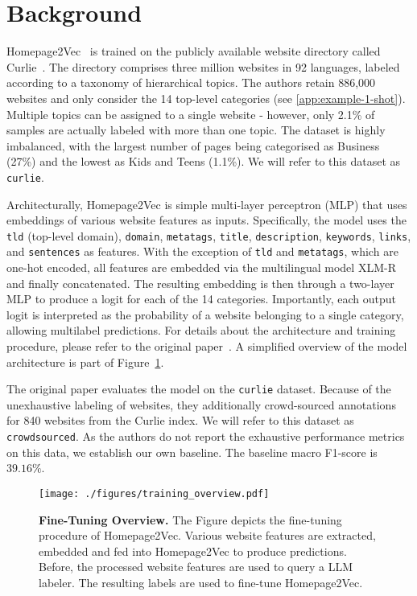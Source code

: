 \section{Background}\label{sec:background}

Homepage2Vec~\cite{homepage2vec} is trained on the publicly available website directory called Curlie~\cite{curlie}. The directory comprises three million websites in 92 languages, labeled according to a taxonomy of hierarchical topics. The authors retain 886,000 websites and only consider the 14 top-level categories (see \ref{app:example-1-shot}). Multiple topics can be assigned to a single website - however, only 2.1\% of samples are actually labeled with more than one topic. The dataset is highly imbalanced, with the largest number of pages being categorised as Business (27\%) and the lowest as Kids and Teens (1.1\%). We will refer to this dataset as \texttt{curlie}.


Architecturally, Homepage2Vec is simple multi-layer perceptron (MLP) that uses embeddings of various website features as inputs.
Specifically, the model uses the \texttt{tld} (top-level domain), \texttt{domain}, \texttt{metatags}, \texttt{title}, \texttt{description}, \texttt{keywords}, \texttt{links}, and \texttt{sentences} as features. With the exception of \texttt{tld} and \texttt{metatags}, which are one-hot encoded, all features are embedded via the multilingual model XLM-R~\cite{xmlr} and finally concatenated. The resulting embedding is then through a two-layer MLP to produce a logit for each of the 14 categories. Importantly, each output logit is interpreted as the probability of a website belonging to a single category, allowing multilabel predictions. For details about the architecture and training procedure, please refer to the original paper~\cite{homepage2vec}. A simplified overview of the model architecture is part of Figure~\ref{fig:train-overview}.

The original paper evaluates the model on the \texttt{curlie} dataset. Because of the unexhaustive labeling of websites, they additionally crowd-sourced annotations for 840 websites from the Curlie index. We will refer to this dataset as \texttt{crowdsourced}. As the authors do not report the exhaustive performance metrics on this data, we establish our own baseline. The baseline macro F1-score is $39.16\%$. 

\begin{figure}[!ht]
    \centering
    \texttt{[image: ./figures/training\_overview.pdf]}
    \caption{\textbf{Fine-Tuning Overview.} The Figure depicts the fine-tuning procedure of Homepage2Vec. Various website features are extracted, embedded and fed into Homepage2Vec to produce predictions. Before, the processed website features are used to query a LLM labeler. The resulting labels are used to fine-tune Homepage2Vec.}
    \label{fig:train-overview}
\end{figure}

